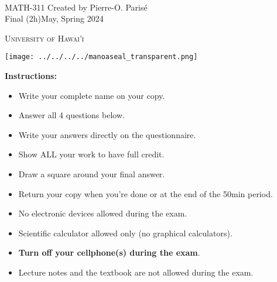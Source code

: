 \documentclass[addpoints, 12pt]{exam}%
\theoremstyle{definition}
\begin{document}
  \noindent \hrulefill \\
  \noindent MATH-311 \hfill Created by Pierre-O. Paris{\'e}\\
  Final (2h)\hfill May, Spring 2024\\\vspace*{-0.7cm}

\noindent\hrulefill

\vspace*{0.5cm}

\begin{center}
\begin{minipage}{0.6\textwidth}
\begin{Huge}
\textsc{University of Hawai'i}
\end{Huge}
\end{minipage}
\begin{minipage}{0.12\textwidth}
\texttt{[image: ../../../../manoaseal\_transparent.png]}
\end{minipage}
\end{center}
  
\vspace*{0.5cm}

\noindent{}

\vspace*{0.5cm}

\noindent{}

\vspace*{1cm}

\begin{center}
\gradetable[h][questions]
\end{center}

\vspace*{1cm}

\noindent\textbf{Instructions:} 

\begin{itemize}
\item Write your complete name on your copy. 
\item Answer all 4 questions below.
\item Write your answers directly on the questionnaire.
\item Show ALL your work to have full credit.
\item Draw a square around your final answer.
\item Return your copy when you're done or at the end of the 50min period. 
\item No electronic devices allowed during the exam. 
\item Scientific calculator allowed only (no graphical calculators).
\item \textbf{Turn off your cellphone(s) during the exam}.
\item Lecture notes and the textbook are not allowed during the exam. 
\end{itemize}
\end{document}
